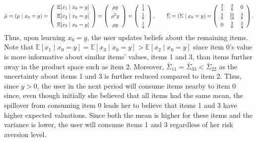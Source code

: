 \documentclass[manuscript, nonacm]{acmart}
\begin{document}
\[ \bar{\mu} = (\mu \mid x_0=y) =  \left (\begin{array}{c}
\mathbb{E}[x_1\mid x_0=y] \vspace{0.15cm} \\
\mathbb{E}[x_2\mid x_0=y] \vspace{0.15cm} \\
\mathbb{E}[x_3\mid x_0=y]
\end{array}  \right) =\left (\begin{array}{c}
\rho y  \vspace{0.15cm} \\
\rho^{2} y  \vspace{0.15cm} \\
 \rho y \\
\end{array} \right) =
\left (\begin{array}{c}
\frac{1}{4} \vspace{0.15cm} \\
\frac{1}{8}  \vspace{0.15cm} \\
\frac{1}{4}
\end{array}  \right),\qquad 
\bar{\Sigma} =(\Sigma\mid x_0=y)=  \left( \begin{array}{ccc}
\frac{3}{4} & \frac{3}{8} & 0 \vspace{0.15cm} \\
\frac{3}{8} & \frac{15}{16} & \frac{3}{8} \vspace{0.15cm}  \\
0 &\frac{3}{8} & \frac{3}{4}  \\
\end{array} \right).
\]
Thus, upon learning $x_0=y$, the user updates beliefs about the remaining items. Note that $\mathbb{E}[x_1\mid x_0=y] = \mathbb{E}[x_3\mid x_0=y] > \mathbb{E}[x_2\mid x_0=y]$ since item 0's value is more informative about similar items' values, items 1 and 3, than items further away in the product space such as item 2. Moreover, $\bar{\Sigma}_{11} = \bar{\Sigma}_{33} < \bar{\Sigma}_{22}$ as the uncertainty about items 1 and 3 is further reduced compared to item 2. Thus, since $y > 0$, the user in the next period will consume items nearby to item 0 since, even though initially she believed that all items had the same mean, the spillover from consuming item 0 leads her to believe that items 1 and 3 have higher expected valuations. Since both the mean is higher for these items and the variance is lower, the user will consume items 1 and 3 regardless of her risk aversion level.
\par 
\end{document}
